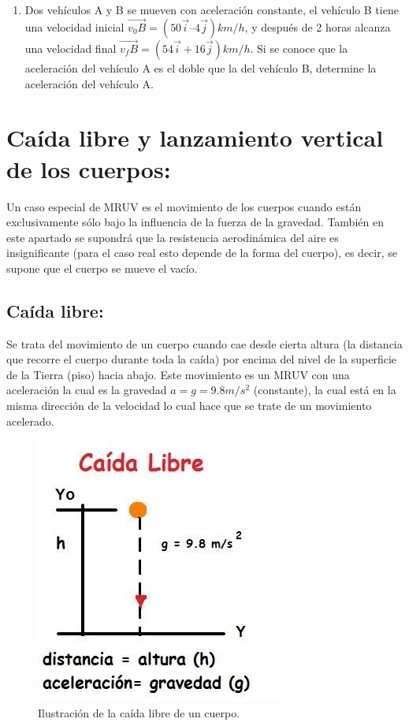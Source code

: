 \documentclass[a5paper,pagesize,10pt,bibtotoc,pointlessnumbers,
normalheadings,DIV=9,fleqn,x11names,table,twoside=false]{scrbook}
\begin{document}
\begin{enumerate}
\item Dos vehículos A y B se mueven con aceleración
 constante, el vehículo B tiene una velocidad inicial $\vec{v_0B} = (50 
\vec{i} – 4 \vec{j}) km/h$, y después de 2
 horas alcanza una velocidad final $\vec{v_fB}=(54 \vec{i} + 16\vec{j}) km/h$. Si se 
conoce que la aceleración
 del vehículo A es el doble que la del vehículo B, determine la aceleración del vehículo A.



\end{enumerate}



\section{Caída libre y lanzamiento vertical de los cuerpos:}

Un caso especial de MRUV es el movimiento de los cuerpos cuando están exclusivamente sólo bajo la influencia de la fuerza de la 
gravedad. También en este apartado se supondrá que la resistencia aerodinámica del aire es insignificante (para el caso real esto 
depende de la forma del cuerpo), es decir, se supone que el cuerpo se mueve el vacío. 

\subsection{Caída libre:}

Se trata del movimiento de un cuerpo cuando cae desde cierta altura (la distancia que recorre el cuerpo durante toda la caída) 
por encima del nivel de la superficie de la Tierra (piso) hacia abajo. Este movimiento es un MRUV con una aceleración la cual es 
la gravedad $a = g = 9.8 m/s^2$ (constante), la cual está en la misma dirección de la velocidad lo cual hace que se trate de un 
movimiento acelerado. 

\begin{figure}[ht]
 \centering
 \includegraphics[scale=0.5]{images/caida-libre.jpg}
 \caption{Ilustración de la caída libre de un cuerpo.}\label{caidalibre}
\end{figure} 
\end{document}
